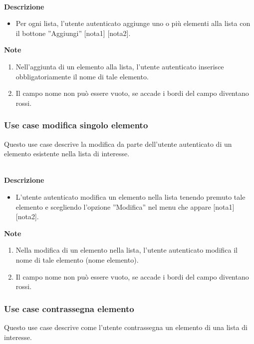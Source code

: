 \documentclass[a4paper,12pt]{article}
\begin{document}
\textbf{\\Descrizione}
\begin{itemize} \setlength\itemsep{0.01em}
\item Per ogni lista, l'utente autenticato aggiunge uno o più elementi alla lista con il bottone ''Aggiungi'' [nota1] [nota2].
\end{itemize}

\textbf{Note}
\begin{enumerate} \setlength\itemsep{0.01em}
\item Nell'aggiunta di un elemento alla lista, l'utente autenticato inserisce obbligatoriamente il nome di tale elemento.
\item Il campo nome non può essere vuoto, se accade i bordi del campo diventano rossi.
\end{enumerate}



\subsubsection*{Use case modifica singolo elemento}

Questo use case descrive la modifica da parte dell'utente autenticato di un elemento esistente nella lista di interesse.

\textbf{\\Descrizione}
\begin{itemize} \setlength\itemsep{0.01em}
\item L'utente autenticato modifica un elemento nella lista tenendo premuto tale elemento e scegliendo l'opzione ''Modifica'' nel menu che appare [nota1][nota2].
\end{itemize}

\textbf{Note}
\begin{enumerate} \setlength\itemsep{0.01em}
\item Nella modifica di un elemento nella lista, l'utente autenticato modifica il nome di tale elemento (nome elemento).
\item Il campo nome non può essere vuoto, se accade i bordi del campo diventano rossi.
\end{enumerate}




\subsubsection*{Use case contrassegna elemento}

Questo use case descrive come l'utente contrassegna un elemento di una lista di interesse.
\end{document}
